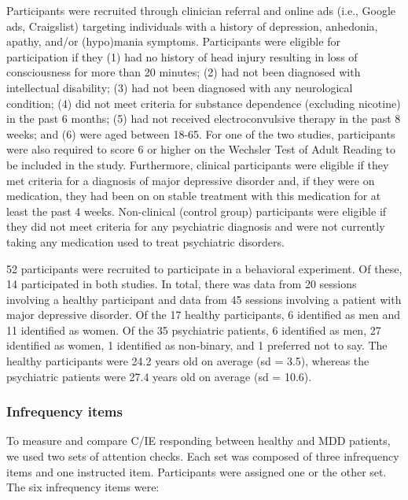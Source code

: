 \documentclass[a4paper,notitlepage,12pt]{article}
\begin{document}
Participants were recruited through clinician referral and online ads (i.e., Google ads, Craigslist) targeting individuals with a history of depression, anhedonia, apathy, and/or (hypo)mania symptoms. Participants were eligible for participation if they (1) had no history of head injury resulting in loss of consciousness for more than 20 minutes; (2) had not been diagnosed with intellectual disability; (3) had not been diagnosed with any neurological condition; (4) did not meet criteria for substance dependence (excluding nicotine) in the past 6 months; (5) had not received electroconvulsive therapy in the past 8 weeks; and (6) were aged between 18-65. For one of the two studies, participants were also required to score 6 or higher on the Wechsler Test of Adult Reading to be included in the study. Furthermore, clinical participants were eligible if they met criteria for a diagnosis of major depressive disorder and, if they were on medication, they had been on on stable treatment with this medication for at least the past 4 weeks. Non-clinical (control group) participants were eligible if they did not meet criteria for any psychiatric diagnosis and were not currently taking any medication used to treat psychiatric disorders.

52 participants were recruited to participate in a behavioral experiment. Of these, 14 participated in both studies. In total, there was data from 20 sessions involving a healthy participant and data from 45 sessions involving a patient with major depressive disorder. Of the 17 healthy participants, 6 identified as men and 11 identified as women. Of the 35 psychiatric patients, 6 identified as men, 27 identified as women, 1 identified as non-binary, and 1 preferred not to say. The healthy participants were 24.2 years old on average (sd = 3.5), whereas the psychiatric patients were 27.4 years old on average (sd = 10.6).

\subsubsection*{Infrequency items}

To measure and compare C/IE responding between healthy and MDD patients, we used two sets of attention checks. Each set was composed of three infrequency items and one instructed item. Participants were assigned one or the other set. The six infrequency items were:
\end{document}
